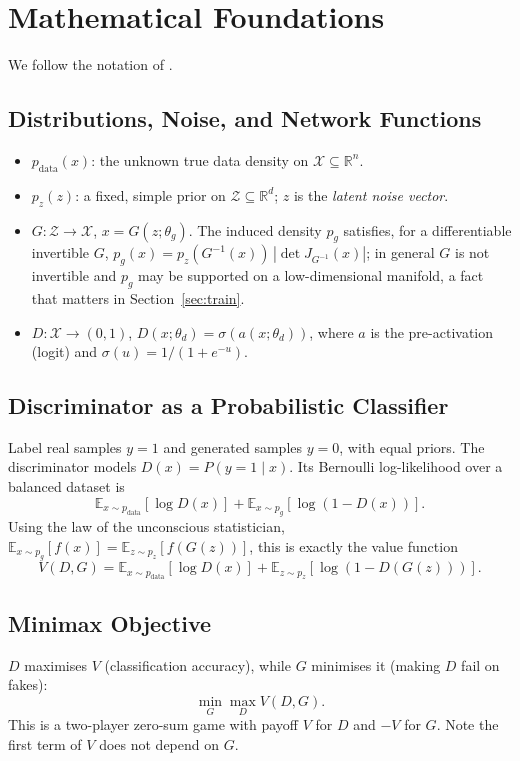 \documentclass[conference]{IEEEtran}
\newcommand{\E}{\mathbb{E}}
\newcommand{\pdata}{p_{\mathrm{data}}}
\newcommand{\pg}{p_{g}}
\newcommand{\pz}{p_{z}}
\newcommand{\thg}{\theta_g}
\newcommand{\thd}{\theta_d}
\theoremstyle{plain}
\theoremstyle{definition}
\begin{document}
\section{Mathematical Foundations}\label{sec:math}
We follow the notation of \cite{goodfellow2014gan}.

\subsection{Distributions, Noise, and Network Functions}
\begin{itemize}
\item $\pdata(x)$: the unknown true data density on $\mathcal{X}\subseteq\mathbb{R}^n$.
\item $\pz(z)$: a fixed, simple prior on $\mathcal{Z}\subseteq\mathbb{R}^d$; $z$ is the \emph{latent noise vector}.
\item $G:\mathcal{Z}\to\mathcal{X}$, $x=G(z;\thg)$. The induced density $\pg$ satisfies, for a differentiable invertible $G$, $\pg(x)=\pz(G^{-1}(x))\,|\det J_{G^{-1}}(x)|$; in general $G$ is not invertible and $\pg$ may be supported on a low-dimensional manifold, a fact that matters in Section~\ref{sec:train}.
\item $D:\mathcal{X}\to(0,1)$, $D(x;\thd)=\sigma(a(x;\thd))$, where $a$ is the pre-activation (logit) and $\sigma(u)=1/(1+e^{-u})$.
\end{itemize}

\subsection{Discriminator as a Probabilistic Classifier}
Label real samples $y=1$ and generated samples $y=0$, with equal priors. The discriminator models $D(x)=P(y=1\mid x)$. Its Bernoulli log-likelihood over a balanced dataset is
\begin{equation}
\E_{x\sim\pdata}[\log D(x)]+\E_{x\sim\pg}[\log(1-D(x))].
\label{eq:bce}
\end{equation}
Using the law of the unconscious statistician, $\E_{x\sim\pg}[f(x)]=\E_{z\sim\pz}[f(G(z))]$, this is exactly the value function
\begin{equation}
V(D,G)=\E_{x\sim\pdata}[\log D(x)]+\E_{z\sim\pz}[\log(1-D(G(z)))].
\label{eq:value}
\end{equation}

\subsection{Minimax Objective}
$D$ maximises $V$ (classification accuracy), while $G$ minimises it (making $D$ fail on fakes):
\begin{equation}
\min_{G}\max_{D}V(D,G).
\label{eq:minimax}
\end{equation}
This is a two-player zero-sum game with payoff $V$ for $D$ and $-V$ for $G$. Note the first term of $V$ does not depend on $G$.
\end{document}
